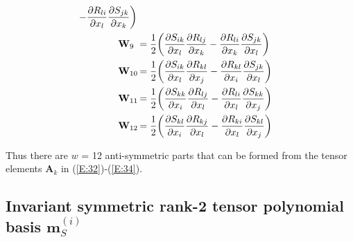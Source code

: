 \begin{subequations}
\begin{align}
				  	- 
					 \frac{\partial R_{li}}{\partial x_l} 
					 \frac{\partial S_{jk}}{\partial x_k} \bigg)  \\
	\mathmakebox[\widthof{$\mathbf{M}_{10}$}][l]{\mathbf{W}_9}
	&= \frac{1}{2} 
			  \bigg( \frac{\partial S_{ik}}{\partial x_l}
					 \frac{\partial R_{lj}}{\partial x_k} 
				  	- 
					 \frac{\partial R_{li}}{\partial x_k} 
					 \frac{\partial S_{jk}}{\partial x_l} \bigg)  \\
	\mathmakebox[\widthof{$\mathbf{M}_{10}$}][l]{\mathbf{W}_{10}}
	&= \frac{1}{2} 
			  \bigg( \frac{\partial S_{ik}}{\partial x_l}
					 \frac{\partial R_{kl}}{\partial x_j} 
				  	- 
					 \frac{\partial R_{kl}}{\partial x_i} 
					 \frac{\partial S_{jk}}{\partial x_l} \bigg)  \\
	\mathmakebox[\widthof{$\mathbf{M}_{10}$}][l]{\mathbf{W}_{11}}
	&= \frac{1}{2} 
			  \bigg( \frac{\partial S_{kk}}{\partial x_i}
					 \frac{\partial R_{lj}}{\partial x_l} 
				  	- 
					 \frac{\partial R_{li}}{\partial x_l} 
					 \frac{\partial S_{kk}}{\partial x_j} \bigg)  \\
	\mathmakebox[\widthof{$\mathbf{M}_{10}$}][l]{\mathbf{W}_{12}}
	&= \frac{1}{2} 
			  \bigg( \frac{\partial S_{kl}}{\partial x_i}
					 \frac{\partial R_{kj}}{\partial x_l} 
				  	- 
					 \frac{\partial R_{ki}}{\partial x_l} 
					 \frac{\partial S_{kl}}{\partial x_j} \bigg)
\end{align}
\end{subequations}
%
%    

Thus there are $w$ = 12 anti-symmetric parts that can be formed from the tensor elements $\mathbf{A}_k$ in (\ref{E:32})-(\ref{E:34}).  

\subsection{Invariant symmetric rank-2 tensor polynomial basis $\mathbf{m}^{(i)}_S$}
\label{sec:2E}

